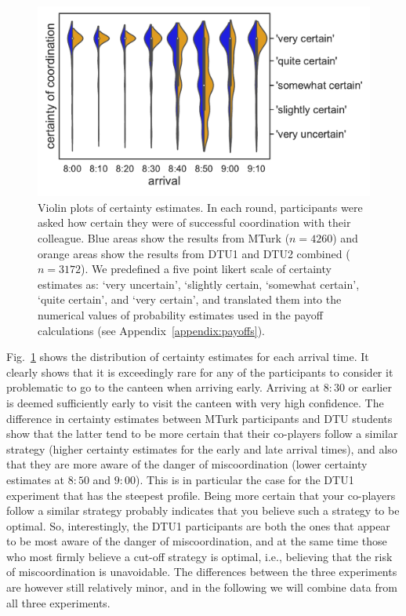 \documentclass[twocolumn,a4paper,superscriptaddress,nofootinbib]{revtex4}
\newcommand{\tobo}[1]{{\color{red} TOBO: #1}}
\newcommand{\tsn}[1]{{\color{blue} TSN: #1}}
\newcommand{\re}[1]{{\color{brown} RE: #1}}
\begin{document}
\begin{figure} %
\centering\includegraphics[width=0.8\linewidth]{fig2_certainties}
\caption{Violin plots of certainty estimates. In each round, participants were asked how certain they were of successful coordination with their colleague. Blue areas show the results from MTurk ($n=4260$) and orange areas show the results from DTU1 and DTU2 combined ($n=3172$). We predefined a five point likert scale of certainty estimates as: `very uncertain', `slightly certain, `somewhat certain', `quite certain', and `very certain', and translated them into the numerical values of probability estimates used in the payoff calculations (see Appendix~\ref{appendix:payoffs}).}
\label{fig:certain}
\end{figure}
Fig.~\ref{fig:certain} shows the distribution of certainty estimates for each arrival time. It clearly shows that it is exceedingly rare for any of the participants to consider it problematic to go to the canteen when arriving early. Arriving at $8{:}30$ or earlier is deemed sufficiently early to visit the canteen with very high confidence. %
The difference in certainty estimates between MTurk participants and DTU students show that the latter tend to be more certain that their co-players follow a similar strategy (higher certainty estimates for the early and late arrival times), and also that they are more aware of the danger of miscoordination (lower certainty estimates at $8{:}50$ and $9{:}00$). This is in particular the case for the DTU1 experiment that has the steepest profile. Being more certain that your co-players follow a similar strategy probably indicates that you believe such a strategy to be optimal. So, interestingly, the DTU1 participants are both the ones that appear to be most aware of the danger of miscoordination, and at the same time those who most firmly believe a cut-off strategy is optimal, i.e., believing that the risk of miscoordination is unavoidable. The differences between the three experiments are however still relatively minor, and in the following we will combine data from all three experiments.
\end{document}
